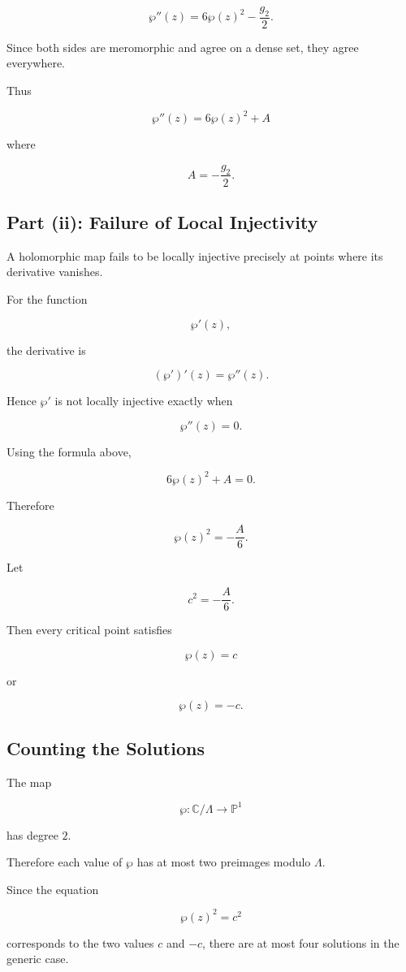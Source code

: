 \documentclass[12pt,a4paper]{article}
\theoremstyle{notespace}
\begin{document}
\[
\wp''(z)
=
6\wp(z)^2-\frac{g_2}{2}.
\]

Since both sides are meromorphic and agree on a dense set, they agree everywhere.

Thus

\[
\boxed{
	\wp''(z)
	=
	6\wp(z)^2+A
}
\]

where

\[
A=-\frac{g_2}{2}.
\]

\subsection{Part (ii): Failure of Local Injectivity}

A holomorphic map fails to be locally injective precisely at points where its derivative vanishes.

For the function

\[
\wp'(z),
\]

the derivative is

\[
(\wp')'(z)=\wp''(z).
\]

Hence \(\wp'\) is not locally injective exactly when

\[
\wp''(z)=0.
\]

Using the formula above,

\[
6\wp(z)^2+A=0.
\]

Therefore

\[
\wp(z)^2
=
-\frac{A}{6}.
\]

Let

\[
c^2
=
-\frac{A}{6}.
\]

Then every critical point satisfies

\[
\wp(z)=c
\]

or

\[
\wp(z)=-c.
\]

\subsection{Counting the Solutions}

The map

\[
\wp:\mathbb C/\Lambda\to\mathbb P^1
\]

has degree \(2\).

Therefore each value of \(\wp\) has at most two preimages modulo \(\Lambda\).

Since the equation

\[
\wp(z)^2=c^2
\]

corresponds to the two values \(c\) and \(-c\), there are at most four solutions in the generic case.
\end{document}
